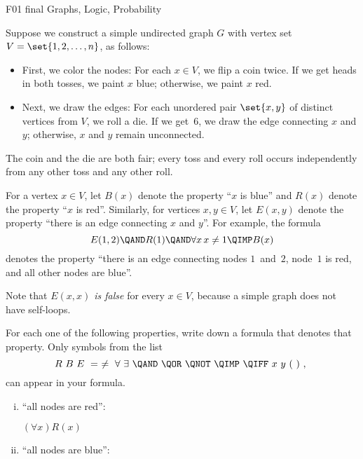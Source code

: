 \begin{problem}
\begin{staffnotes}
F01 final
Graphs, Logic, Probability
\end{staffnotes}

Suppose we construct a simple undirected graph $G$ with vertex set
$V=\set{1,2,\dots,n}$, as follows:

\begin{itemize}
\item
First, we color the nodes: For each $x\in V$, we flip a coin twice. 
If we get heads in both tosses, we paint $x$ blue; otherwise, we paint 
$x$ red. 
\item
Next, we draw the edges: For each unordered pair $\set{x,y}$ of
distinct vertices from $V$, we roll a die. If we get~$6$, we draw
the edge connecting $x$ and $y$; otherwise, $x$ and $y$ remain
unconnected.  
\end{itemize} 

The coin and the die are both fair; every toss and every roll occurs
independently from any other toss and any other roll. 

For a vertex $x\in V$, let $B(x)$ denote the property ``$x$ is blue'' and
$R(x)$ denote the property ``$x$ is red''. Similarly, for vertices $x,y\in
V$, let $E(x,y)$ denote the property ``there is an edge connecting $x$ and
$y$''. For example, the formula
\[
E(1,2) \QAND 
R(1)   \QAND 
\forall x\, x\neq 1 \QIMP B(x)
\]
denotes the property ``there is an edge connecting nodes $1$~and~$2$,
node~$1$ is red, and all other nodes are blue''.

Note that \emph{$E(x,x)$ is false} for every $x \in V$, because a simple
graph does not have self-loops.

\bparts
\ppart
For each one of the following properties, write down a formula that
denotes that property.  Only symbols from the list
\[
R\ B\ E\ 
=\ \neq\ 
\forall\ \exists\ 
\QAND\ \QOR\ \QNOT\ \QIMP\ \QIFF\
x\ y\ 
(\ )\ ,\
\]
can appear in your formula.

\begin{enumerate}[(i)]


\item \label{item-first} ``all nodes are red'': 

\begin{solution}
$(\forall x)R(x)$
\end{solution}

\item
``all nodes are blue'': 


\end{enumerate}
\end{problem}

